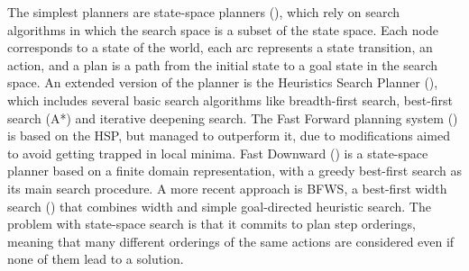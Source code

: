 The simplest planners are state-space planners (\cite{ghallab2004automated}), which rely on search algorithms in which the search space is a subset of the state space. 
Each node corresponds to a state of the world, each arc represents a state transition, \ie an action, and a plan is a path from the initial state to a goal state in the search space. 
An extended version of the planner is the Heuristics Search Planner (\cite{bonet:01}), which includes several basic search algorithms like breadth-first search, best-first search (\eg A*) and iterative deepening search. 
The Fast Forward planning system (\cite{hoffmann2001ff}) is based on the HSP, but managed to outperform it, due to modifications aimed to avoid getting trapped in local minima. %
Fast Downward (\cite{helmert:06a}) is a state-space planner based on a finite domain representation, with a greedy best-first search as its main search procedure.
A more recent approach is BFWS, a best-first width search  (\cite{lipovetzky2017best}) that combines width and simple goal-directed heuristic search.
The problem with state-space search is that it commits to plan step orderings, meaning that many different orderings of the same actions are considered even if none of them lead to a solution.

